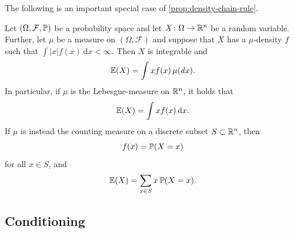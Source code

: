 The following is an important special case of \cref{prop:density-chain-rule}.
\begin{proposition}
    Let $(\Omega, \mathcal{F}, \mathbb{P})$ be a probability space and let $X\colon \Omega \to \mathbb{R}^n$ be a
    random variable. Further, let $\mu$ be a measure on $(\Omega, \mathcal{F})$ and suppose
    that $X$ has a $\mu$-density $f$ such that $\int |x|f(x) \, \text{d}x < \infty$. Then $X$ is integrable
    and
    \[
        \mathbb{E}(X) = \int x f(x) \, \mu(dx).
    \]
    In particular, if $\mu$ is the Lebesgue-measure on $\mathbb{R}^n$, it holds that
    \[
        \mathbb{E}(X) = \int x f(x) \, \textnormal{d}x.
    \]
    If $\mu$ is instead the counting measure on a discrete subset $S\subset \mathbb{R}^n$, then
    \[
        f(x) = \mathbb{P}(X = x)
    \]
    for all $x\in S$, and
    \[
        \mathbb{E}(X) = \sum_{x\in S} x \, \mathbb{P}(X = x).
    \]
\end{proposition}

\subsection{Conditioning}

